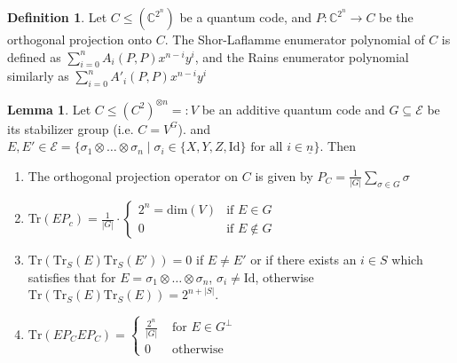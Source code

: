 \documentclass[12pt,a4paper,BCOR15mm,twoside,DIV12]{article}
\def\C{\mathbb{C}}
\def\fa{\text{ for all }}
\def\Tr{\text{Tr}}
\def\Id{\text{Id}}
\theoremstyle{definition}
\newtheorem{defn}[Satz]{Definition}
\newtheorem{lem}[Satz]{Lemma}
\begin{document}
\begin{defn}
Let $C \leq (\C^{2^n})$ be a quantum code, and $P: \C^{2^n} \rightarrow C$ be the orthogonal projection onto $C$. 
The Shor-Laflamme enumerator polynomial of $C$ is defined as $ \sum_{i=0}^n A_i(P,P) x^{n-i}y^i$, and the Rains enumerator polynomial similarly as  $\sum_{i=0}^n A'_i(P,P) x^{n-i}y^i$
\end{defn}

\begin{lem}\label{lemmaenums}
Let $C \leq (C^2)^{\otimes n} =: V$ be an additive quantum code and $G \subseteq \mathcal{E}$ be its stabilizer group (i.e. $C = V^G$). and $E,E' \in \mathcal{E} = \{ \sigma_1 \otimes \ldots \otimes \sigma_n \mid \sigma_i \in \{X,Y,Z,\Id \} \fa i \in \underline{n} \}$. Then
\begin{enumerate}
\item The orthogonal projection operator on $C$ is given by $P_C = \frac{1}{|G|} \sum_{\sigma \in G} \sigma$
\item Tr$(EP_c) = \frac{1}{|G|} \cdot \left\{ \begin{array}{lr} 2^n = \text{dim}(V) & \text{if } E \in G \\ 0 & \text{if } E \notin G \end{array} \right.$
\item $\Tr(\Tr_S(E)\Tr_S(E')) = 0$ if $E \neq E'$ or if there exists an $i \in S$ which satisfies that for $E = \sigma_1 \otimes \ldots \otimes \sigma_n$, $\sigma_i \neq \Id$, otherwise $\Tr(\Tr_S(E)\Tr_S(E)) = 2^{n+|S|}$.
\item $\Tr( E P_C E P_C) = \left\{ \begin{array}{lr} \frac{2^n}{|G|} & \text{ for } E \in G^\perp \\ 0 & \text{ otherwise} \end{array} \right.$ 
\end{enumerate}


\end{lem}
\end{document}
